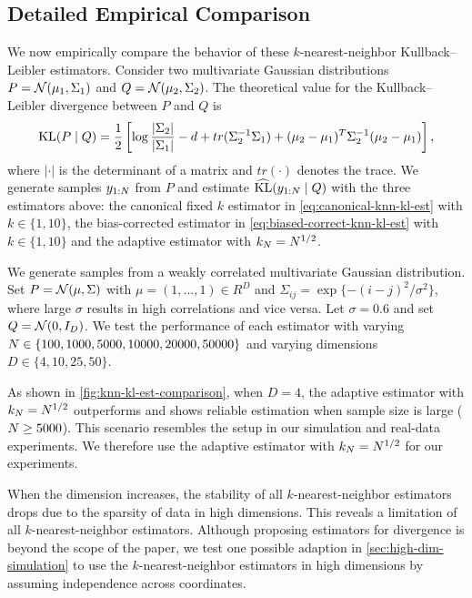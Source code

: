 \subsection{Detailed Empirical Comparison}

We now empirically compare the behavior of these $k$-nearest-neighbor Kullback--Leibler estimators.
Consider two multivariate Gaussian distributions $P = \mathcal{N}(\mu_1, \Sigma_1)$ and $Q = \mathcal{N}(\mu_2, \Sigma_2)$. The theoretical value for the Kullback--Leibler divergence between $P$ and $Q$ is
\begin{equation}
	\kl{P}{Q} = \frac{1}{2}\left[\log\frac{|\Sigma_2|}{|\Sigma_1|} - d + tr(\Sigma_2^{-1}\Sigma_1) + (\mu_2-\mu_1)^T\Sigma_2^{-1}(\mu_2-\mu_1)\right],
	\label{eq:kl-gaussian}
\end{equation}
where $|\cdot|$ is the determinant of a matrix and $tr(\cdot)$ denotes the trace.
We generate samples $y_{1:N}$ from $P$ and estimate $\mathrm{\widehat{KL}}(y_{1:N} \mid Q)$ with the three estimators above:
the canonical fixed $k$ estimator in \cref{eq:canonical-knn-kl-est} with $k\in\{1,10\}$,  the bias-corrected estimator in \cref{eq:biased-correct-knn-kl-est} with $k\in\{1,10\}$ and the adaptive estimator with $k_{N} =  N^{1/2}$.

We generate samples from a weakly correlated multivariate Gaussian distribution. Set $P = \mathcal{N}(\mu, \Sigma)$ with $\mu=(1,\ldots,1)\in R^D$ and $\Sigma_{ij}=\exp\{-(i-j)^2/\sigma^2\}$, where large $\sigma$ results in high correlations and vice versa.
Let $\sigma=0.6$ and set $Q = \mathcal{N}(0, I_{D})$.
We test the performance of each estimator with varying $N \in \{100, 1000, 5000, 10000, 20000, 50000\}$ and varying dimensions $D \in \{4, 10, 25, 50\}$.

As shown in \cref{fig:knn-kl-est-comparison}, when $D=4$, the adaptive estimator with $k_{N}=N^{1/2}$ outperforms and shows reliable estimation when sample size is large ($N \ge 5000$).
This scenario resembles the setup in our simulation and real-data experiments.
We therefore use the adaptive estimator with $k_{N}=N^{1/2}$ for our experiments.

When the dimension increases, the stability of all $k$-nearest-neighbor estimators drops due to the sparsity of data in high dimensions.
This reveals a limitation of all $k$-nearest-neighbor estimators.
Although proposing estimators for divergence is beyond the scope of the paper,
we test one possible adaption in \cref{sec:high-dim-simulation} to use the $k$-nearest-neighbor estimators in high dimensions by assuming independence across coordinates.


